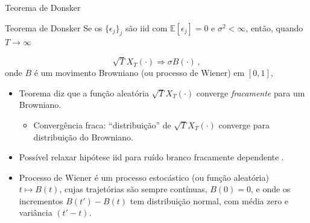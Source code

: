 \documentclass[11pt]{beamer}
\begin{document}
\begin{frame}{Teorema de Donsker}
	\begin{block}{Teorema de Donsker}
		Se os $\{\epsilon_j\}_{j}$ são iid com $\mathbb{E}[\epsilon_j]=0$ e $\sigma^2 < \infty$, então, quando $T \to \infty$
		
		$$\sqrt{T}X_T(\cdot) \Rightarrow \sigma B(\cdot)\, ,$$
		onde $B$ é um movimento Browniano (ou processo de Wiener) em $[0,1]$,
	\end{block}
	\begin{itemize}
		\item Teorema diz que a  função aleatória $\sqrt{T}X_T(\cdot)$ converge \emph{fracamente} para um Browniano.
		\begin{itemize}
			\item Convergência fraca: ``distribuição'' de $\sqrt{T}X_T(\cdot)$ converge para distribuição do Browniano.
		\end{itemize}
		\item Possível relaxar hipótese iid para ruído branco fracamente dependente \citep{Phillips1988}.
		\item Processo de Wiener é um processo estocástico (ou função aleatória) $t \mapsto B(t)$, cujas trajetórias são sempre contínuas, $B(0) = 0$, e onde os incrementos $B(t') - B(t)$ tem distribuição normal, com média zero e variância $(t'-t)$.
	\end{itemize}
\end{frame}
\end{document}
